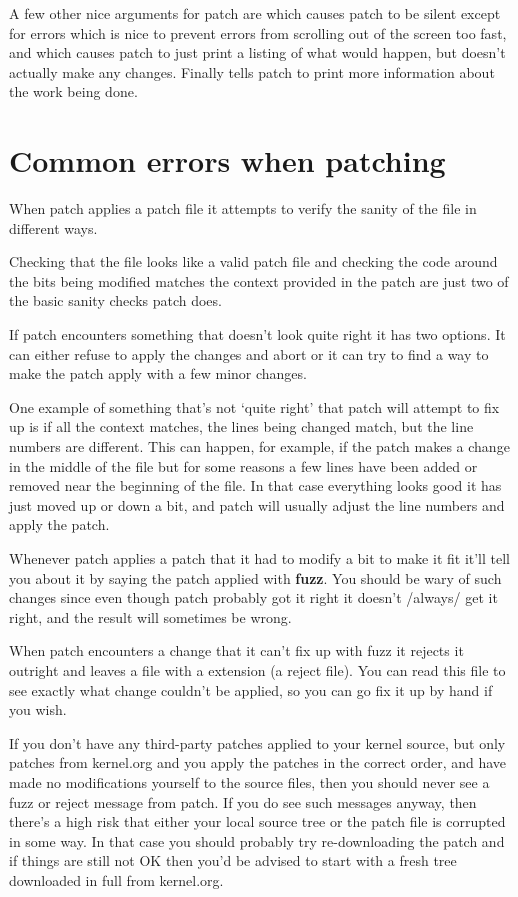 \documentclass[a4paper,8pt,english]{sphinxmanual}
\begin{document}
A few other nice arguments for patch are  which causes patch to be silent
except for errors which is nice to prevent errors from scrolling out of the
screen too fast, and  which causes patch to just print a listing of
what would happen, but doesn't actually make any changes. Finally 
tells patch to print more information about the work being done.


\section{Common errors when patching}
\label{process/applying-patches:common-errors-when-patching}
When patch applies a patch file it attempts to verify the sanity of the
file in different ways.

Checking that the file looks like a valid patch file and checking the code
around the bits being modified matches the context provided in the patch are
just two of the basic sanity checks patch does.

If patch encounters something that doesn't look quite right it has two
options. It can either refuse to apply the changes and abort or it can try
to find a way to make the patch apply with a few minor changes.

One example of something that's not `quite right' that patch will attempt to
fix up is if all the context matches, the lines being changed match, but the
line numbers are different. This can happen, for example, if the patch makes
a change in the middle of the file but for some reasons a few lines have
been added or removed near the beginning of the file. In that case
everything looks good it has just moved up or down a bit, and patch will
usually adjust the line numbers and apply the patch.

Whenever patch applies a patch that it had to modify a bit to make it fit
it'll tell you about it by saying the patch applied with \textbf{fuzz}.
You should be wary of such changes since even though patch probably got it
right it doesn't /always/ get it right, and the result will sometimes be
wrong.

When patch encounters a change that it can't fix up with fuzz it rejects it
outright and leaves a file with a  extension (a reject file). You can
read this file to see exactly what change couldn't be applied, so you can
go fix it up by hand if you wish.

If you don't have any third-party patches applied to your kernel source, but
only patches from kernel.org and you apply the patches in the correct order,
and have made no modifications yourself to the source files, then you should
never see a fuzz or reject message from patch. If you do see such messages
anyway, then there's a high risk that either your local source tree or the
patch file is corrupted in some way. In that case you should probably try
re-downloading the patch and if things are still not OK then you'd be advised
to start with a fresh tree downloaded in full from kernel.org.
\end{document}
